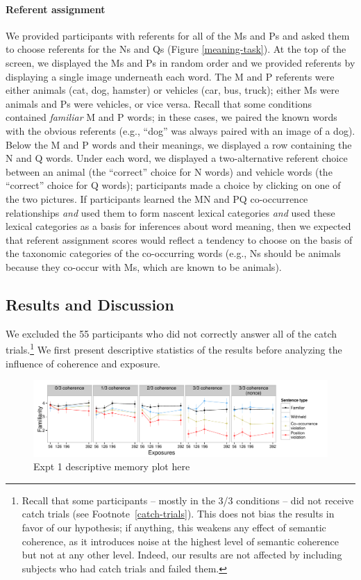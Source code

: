 \documentclass[man,floatsintext]{apa6}
\begin{document}
\paragraph{Referent assignment}
We provided participants with referents for all of the Ms and Ps and asked them to choose referents for the Ns and Qs (Figure \ref{meaning-task}). At the top of the screen, we displayed the Ms and Ps in random order and we provided referents by displaying a single image underneath each word. The M and P referents were either animals (cat, dog, hamster) or vehicles (car, bus, truck); either Ms were animals and Ps were vehicles, or vice versa. Recall that some conditions contained \emph{familiar} M and P words; in these cases, we paired the known words with the obvious referents (e.g., ``dog'' was always paired with an image of a dog). Below the M and P words and their meanings, we displayed a row containing the N and Q words. Under each word, we displayed a two-alternative referent choice between an animal (the ``correct'' choice for N words) and vehicle words (the ``correct'' choice for Q words); participants made a choice by clicking on one of the two pictures. If participants learned the MN and PQ co-occurrence relationships \emph{and} used them to form nascent lexical categories \emph{and} used these lexical categories as a basis for inferences about word meaning, then we expected that referent assignment scores would reflect a tendency to choose on the basis of the taxonomic categories of the co-occurring words (e.g., Ns should be animals because they co-occur with Ms, which are known to be animals).

\subsection{Results and Discussion}
We excluded the 55 participants who did not correctly answer all of the catch trials.\footnote{ Recall that some participants -- mostly in the 3/3 conditions --  did not receive catch trials (see Footnote~\ref{catch-trials}). This does not bias the results in favor of our hypothesis; if anything, this weakens any effect of semantic coherence, as it introduces noise at the highest level of semantic coherence but not at any other level. Indeed, our results are not affected by including subjects who had catch trials and failed them.} We first present descriptive statistics of the results before analyzing the influence of coherence and exposure.

\begin{figure}[t]
  \begin{center}
    \includegraphics[width=1.0\linewidth]{x1-descriptive-memory} 
    \caption{Expt 1 descriptive memory plot here}
    \label{x1-descriptive-mem}
  \end{center}
\end{figure}
\end{document}
